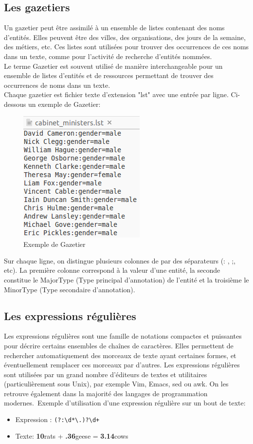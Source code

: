 \documentclass[a4paper, 11pt]{report}
\begin{document}
\subsection{Les gazetiers}
Un gazetier peut être assimilé à un ensemble de listes contenant des noms d'entités. Elles peuvent être des villes, des organisations, des jours de la semaine, des métiers, etc. Ces listes sont utilisées pour trouver des occurrences de ces noms dans un texte, comme pour l'activité de recherche d'entités nommées.\\
Le terme Gazetier est souvent utilisé de manière interchangeable pour un ensemble de listes d'entités et de ressources permettant de trouver des occurrences de noms dans un texte.\\
Chaque gazetier est fichier texte d'extension "lst" avec une entrée par ligne.\cite{w4}
Ci-dessous un exemple de Gazetier:
\begin{figure}[H]
\begin{center}
\includegraphics[scale=0.5]{img/exGazetier.png}
\end{center}
\caption{Exemple de Gazetier}
\end{figure}
Sur chaque ligne, on distingue plusieurs colonnes de par des séparateurs (: , ;, etc). La première colonne correspond à la valeur d'une entité, la seconde constitue le MajorType (Type principal d'annotation) de l'entité et la troisième le MinorType (Type secondaire d'annotation).\cite{w4}
\subsection{Les expressions régulières}
Les expressions régulières sont une famille de notations compactes et puissantes pour décrire certains ensembles de chaînes de caractères. Elles permettent de rechercher automatiquement des morceaux de texte ayant certaines formes, et éventuellement remplacer ces morceaux par d'autres.
Les expressions régulières sont utilisées par un grand nombre d'éditeurs de textes et utilitaires (particulièrement sous Unix), par exemple Vim, Emacs, sed ou awk. On les retrouve également dans la majorité des langages de programmation modernes.\cite{w3}\
Exemple d'utilisation d'une expression régulière sur un bout de texte:
\begin{itemize}
\item Expression : \verb|(?:\d*\.)?\d+|
\item Texte: \textbf{10}rats + \textbf{.36}geese = \textbf{3.14}cows
\end{itemize}
\end{document}
